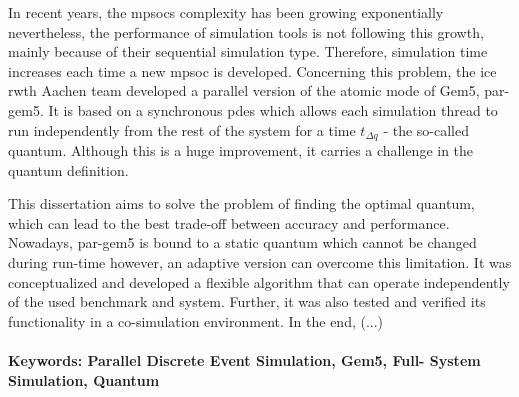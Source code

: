 





In recent years, the \glspl{mpsoc} complexity has been growing exponentially nevertheless, the performance of simulation tools is not 
following this growth, mainly because of their sequential simulation type. Therefore, simulation time increases each time a new \gls{mpsoc} 
is developed. Concerning this problem, the \gls{ice} \gls{rwth} Aachen team developed a parallel version of the atomic mode of Gem5, par-gem5. 
It is based on a synchronous \gls{pdes} which allows each simulation thread to run independently from the rest of the system for a time 
$t_{\Delta q}$ - the so-called quantum. Although this is a huge improvement, it carries a challenge in the quantum definition. 

This dissertation aims to solve the problem of finding the optimal quantum, which can lead to the best trade-off between accuracy and 
performance. Nowadays, par-gem5 is bound to a static quantum which cannot be changed during run-time however, an adaptive version can overcome 
this limitation. It was conceptualized and developed a flexible algorithm that can operate independently of the used benchmark and system.
Further, it was also tested and verified its functionality in a co-simulation environment. In the end, (...)


\paragraph{}\textbf{Keywords: Parallel Discrete Event Simulation, Gem5, Full-
System Simulation, Quantum}
\begin{comment}
\glsreset{FPGA}
\end{comment}

